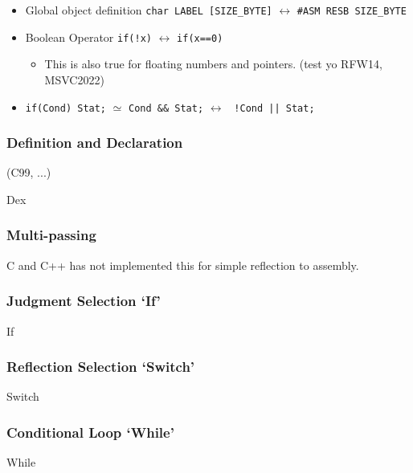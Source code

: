 \begin{itemize}
\item Global object definition \verb|char LABEL [SIZE_BYTE]| $\leftrightarrow$ \verb|#ASM RESB SIZE_BYTE|
\item Boolean Operator \verb|if(!x)| $\leftrightarrow$ \verb|if(x==0)|
\begin{itemize}

\item This is also true for floating numbers and pointers. (test yo RFW14, MSVC2022)
\end{itemize}

\item \verb|if(Cond) Stat;| $\simeq$ \verb|Cond && Stat;| $\leftrightarrow$ \verb+ !Cond || Stat; +
\end{itemize}



\subsubsection{Definition and Declaration}

(C99, ...)

{Dex}



\subsubsection{Multi-passing}

C and C++ has not implemented this for simple reflection to assembly.



\subsubsection{Judgment Selection `If'}

{If}



\subsubsection{Reflection Selection `Switch'}

{Switch}



\subsubsection{Conditional Loop `While'}

{While}



